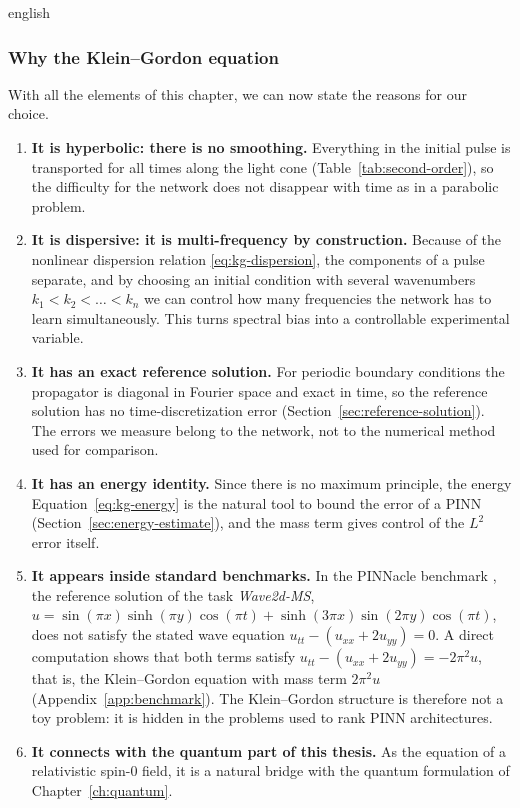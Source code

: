 \documentclass[0000.tex]{subfiles}
\begin{document}
\begin{hyphenrules}{english}
\subsubsection{Why the Klein--Gordon equation}
With all the elements of this chapter, we can now state the reasons for our choice.
\begin{enumerate}
  \item \textbf{It is hyperbolic: there is no smoothing.} Everything in the initial pulse is
    transported for all times along the light cone (Table~\ref{tab:second-order}), so the difficulty for
    the network does not disappear with time as in a parabolic problem.
  \item \textbf{It is dispersive: it is multi-frequency by construction.} Because of the nonlinear
    dispersion relation \eqref{eq:kg-dispersion}, the components of a pulse separate, and by choosing
    an initial condition with several wavenumbers $k_1<k_2<\dots<k_n$ we can control how many
    frequencies the network has to learn simultaneously. This turns spectral bias into a controllable
    experimental variable.
  \item \textbf{It has an exact reference solution.} For periodic boundary conditions the propagator
    is diagonal in Fourier space and exact in time, so the reference solution has no time-discretization
    error (Section~\ref{sec:reference-solution}). The errors we measure belong to the network, not to the
    numerical method used for comparison.
  \item \textbf{It has an energy identity.} Since there is no maximum principle, the energy
    Equation~\eqref{eq:kg-energy} is the natural tool to bound the error of a PINN (Section~\ref{sec:energy-estimate}),
    and the mass term gives control of the $L^2$ error itself.
  \item \textbf{It appears inside standard benchmarks.} In the PINNacle benchmark
    \cite{hao2024pinnacle}, the reference solution of the task \emph{Wave2d-MS},
    $u=\sin(\pi x)\sinh(\pi y)\cos(\pi t)+\sinh(3\pi x)\sin(2\pi y)\cos(\pi t)$, does not satisfy the
    stated wave equation $u_{tt}-(u_{xx}+2u_{yy})=0$. A direct computation shows that both terms satisfy
    $u_{tt}-(u_{xx}+2u_{yy})=-2\pi^2u$, that is, the Klein--Gordon equation with mass term $2\pi^2u$
    (Appendix~\ref{app:benchmark}). The Klein--Gordon structure is therefore not a toy problem: it is hidden in
    the problems used to rank PINN architectures.
  \item \textbf{It connects with the quantum part of this thesis.} As the equation of a relativistic
    spin-0 field, it is a natural bridge with the quantum formulation of Chapter~\ref{ch:quantum}.
\end{enumerate}


\end{hyphenrules}
\end{document}
